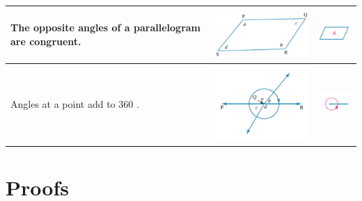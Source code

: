\documentclass{book}
\begin{document}
\begin{center}
\begin{tabular}{|p{5cm}|p{6cm}|p{2cm}|}
		The opposite angles of a parallelogram are congruent.           & \includegraphics[width=6cm]{geometry theorem 10} & \includegraphics[width=2cm]{geometry theorem 10 symbol} \\ \hline
		Angles at a point add to 360 \degree.                           & \includegraphics[width=6cm]{geometry theorem 11} & \includegraphics[width=2cm]{geometry theorem 11 symbol} \\ \hline
	\end{tabular}
\end{center}

\chapter{Proofs}
\end{document}
